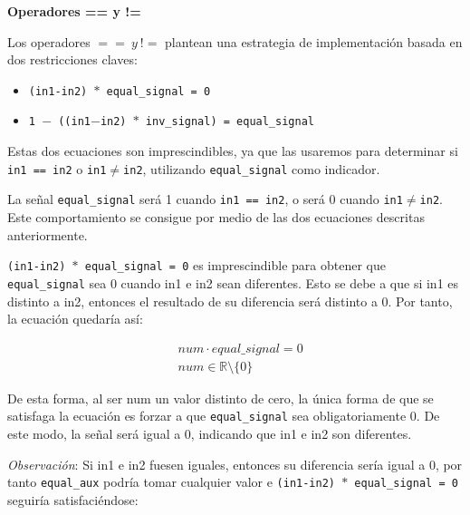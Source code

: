 \documentclass[a4paper,12pt]{report}
\begin{document}
	
	\vspace{0.6cm}
	\noindent \textbf{Operadores == y !=}
	\vspace{0.2cm}
	
	\label{sss:ops-eq-neq}
	\vspace{0.2cm}
	\noindent Los operadores $== \ y \ !=$ plantean una estrategia de implementación basada en dos restricciones claves:
	
	\begin{itemize}
		\item \texttt{(in1-in2) $*$ equal\_signal = 0}
		\item \texttt{1 $-$ ((in1$-$in2) $*$ inv\_signal) = equal\_signal}
	\end{itemize}
	
	\vspace{0.2cm}
	\noindent Estas dos ecuaciones son imprescindibles, ya que las usaremos para determinar si \texttt{in1 == in2} o \texttt{in1}$\neq$\texttt{in2}, utilizando  \texttt{equal\_signal} como indicador.
	
	\vspace{0.2cm}
	\noindent La señal  \texttt{equal\_signal} será 1 cuando \texttt{in1 == in2}, o será 0 cuando \texttt{in1}$\neq$\texttt{in2}. Este comportamiento se consigue por medio de las dos ecuaciones descritas anteriormente.
	
	\vspace{0.2cm}
	\noindent \texttt{(in1-in2) $*$ equal\_signal = 0} es imprescindible para obtener que  \texttt{equal\_signal} sea 0 cuando in1 e in2 sean diferentes. Esto se debe a que si in1 es distinto a in2, entonces el resultado de su diferencia será distinto a 0. Por tanto, la ecuación quedaría así:
	
	\begin{equation}
		\begin{aligned}
			&num \cdot equal\_signal = 0 \\
			&num \in \mathbb{R} \setminus \{0\}
		\end{aligned}
	\end{equation}
	
	\vspace{0.2cm}
	\noindent De esta forma, al ser num un valor distinto de cero, la única forma de que se satisfaga la ecuación es forzar a que  \texttt{equal\_signal} sea obligatoriamente 0. De este modo, la señal será igual a 0, indicando que in1 e in2 son diferentes.
	
	\vspace{0.2cm}
	\noindent \textit{Observación}: Si in1 e in2 fuesen iguales, entonces su diferencia sería igual a 0, por tanto  \texttt{equal\_aux} podría tomar cualquier valor e \texttt{(in1-in2) $*$ equal\_signal = 0} seguiría satisfaciéndose:
	
\end{document}
